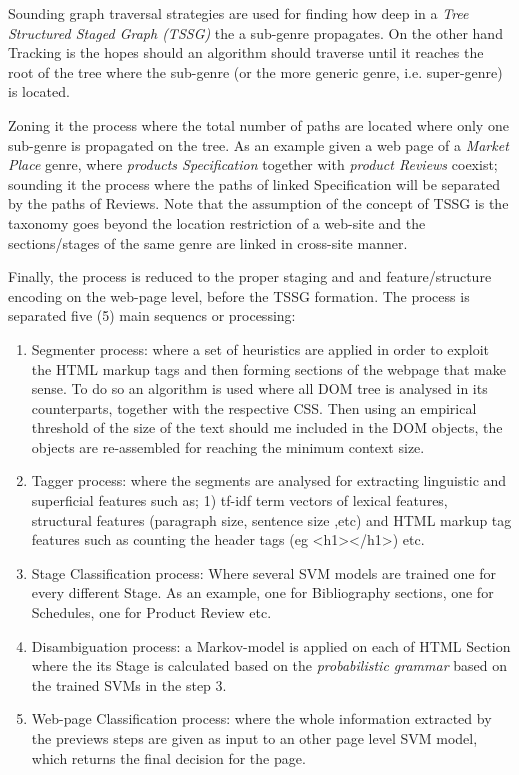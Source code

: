 Sounding graph traversal strategies are used for finding how deep in a \textit{Tree Structured Staged Graph (TSSG)}  the a sub-genre propagates. On the other hand Tracking is the hopes should an algorithm should traverse until it reaches the root of the tree where the sub-genre (or the more generic genre, i.e. super-genre) is located. 

Zoning it the process where the total number of paths are located where only one sub-genre is propagated on the tree. As an example given a web page of a \textit{Market Place} genre, where \textit{products Specification} together with \textit{product Reviews} coexist; sounding it the process where the paths of linked Specification will be separated by the paths of Reviews. Note that the assumption of the concept of TSSG is the taxonomy goes beyond the location restriction of a web-site and the sections/stages of the same genre are linked in cross-site manner.

Finally, the process is reduced to the proper staging and and feature/structure encoding on the web-page level, before the TSSG formation. The process is separated five (5) main sequencs or processing:

\begin{enumerate}
\item Segmenter process: where a set of heuristics are applied in order to exploit the HTML markup tags and then forming sections of the webpage that make sense. To do so an algorithm is used where all DOM tree is analysed in its counterparts, together with the respective CSS. Then using an empirical threshold of the size of the text should me included in the DOM objects, the objects are re-assembled for reaching the minimum context size.
\item Tagger process: where the segments are analysed for extracting linguistic and superficial features such as; 1) tf-idf term vectors of lexical features, structural features (paragraph size, sentence size ,etc) and HTML markup tag features such as counting the header tags (eg <h1></h1>) etc.
\item Stage Classification process: Where several SVM models are trained one for every different Stage. As an example, one for Bibliography sections, one for Schedules, one for Product Review etc.
\item Disambiguation process: a Markov-model is applied on each of  HTML Section where the its Stage is calculated based on the \textit{probabilistic grammar} based on the trained SVMs in the step 3.
\item Web-page Classification process: where the whole information extracted by the previews steps are given as input to an other page level SVM model, which returns the final decision for the page. 
\end{enumerate}

